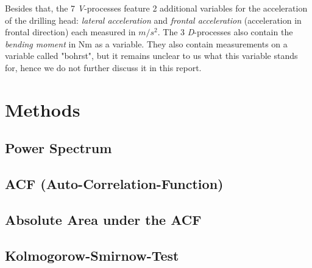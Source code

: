 \documentclass[12 pt]{scrartcl}
\begin{document}
Besides that, the 7 \emph{V}-processes feature 2 additional variables for the acceleration of the drilling head: \emph{lateral acceleration} and \emph{frontal acceleration} (acceleration in frontal direction) each measured in $m/s^2$.
The 3 \emph{D}-processes also contain the \emph{bending moment} in Nm as a variable. They also contain measurements on a variable called "bohrst", but it remains unclear to us what this variable stands for, hence we do not further discuss it in this report.









\section{Methods}


\subsection{Power Spectrum}


\subsection{ACF (Auto-Correlation-Function)}



\subsection{Absolute Area under the ACF}

\subsection{Kolmogorow-Smirnow-Test}
\end{document}
